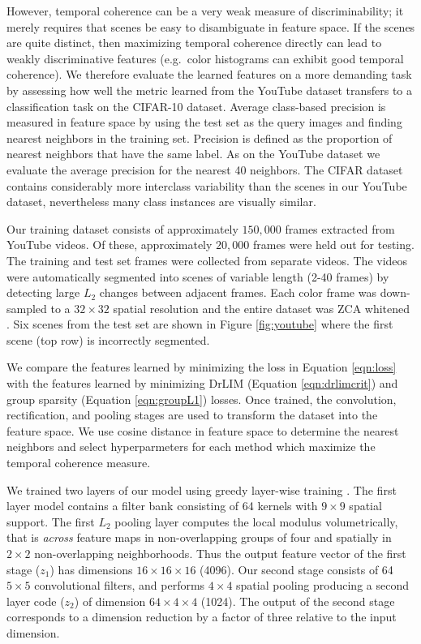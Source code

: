 \documentclass{article} %
\begin{document}
However, temporal coherence can be a very weak measure of discriminability; it merely requires that scenes be easy to disambiguate in feature space. If the scenes are quite distinct, then maximizing temporal coherence directly can lead to weakly discriminative features (e.g.~color histograms can exhibit good temporal coherence). We therefore evaluate the learned features on a more demanding task by assessing how well the metric learned from the YouTube dataset transfers to a classification task on the CIFAR-10 dataset. Average class-based precision is measured in feature space by using the test set as the query images and finding nearest neighbors in the training set. Precision is defined as the proportion of nearest neighbors that have the same label. As on the YouTube dataset we evaluate the average precision for the nearest 40 neighbors. The CIFAR dataset contains considerably more interclass variability than the scenes in our YouTube dataset, nevertheless many class instances are visually similar.  

Our training dataset consists of approximately $150,000$ frames extracted from YouTube videos. Of these, approximately $20,000$ frames were held out for testing. The training and test set frames were collected from separate videos. The videos were automatically segmented into scenes of variable length (2-40 frames) by detecting large $L_2$ changes between adjacent frames. Each color frame was down-sampled to a $32 \times 32$ spatial resolution and the entire dataset was ZCA whitened \citep{alexthesis}. Six scenes from the test set are shown in Figure \ref{fig:youtube} where the first scene (top row) is incorrectly segmented.   

We compare the features learned by minimizing the loss in Equation \ref{eqn:loss} with the features learned by minimizing DrLIM (Equation \ref{eqn:drlimcrit}) and group sparsity (Equation \ref{eqn:groupL1}) losses. Once trained, the convolution, rectification, and pooling stages are used to transform the dataset into the feature space. We use cosine distance in feature space to determine the nearest neighbors and select hyperparmeters for each method which maximize the temporal coherence measure.

We trained two layers of our model using greedy layer-wise training \cite{Bengio2012}. The first layer model contains a filter bank consisting of 64 kernels with $9 \times 9$ spatial support. The first $L_2$ pooling layer computes the local modulus volumetrically, that is \emph{across} feature maps in non-overlapping groups of four and spatially in $2 \times 2$ non-overlapping neighborhoods. Thus the output feature vector of the first stage ($z_1$) has dimensions $16 \times 16 \times 16$ (4096). Our second stage consists of 64 $5 \times 5$ convolutional filters, and performs $4 \times 4$ spatial pooling producing a second layer code ($z_2$) of dimension $64 \times 4 \times 4$ (1024). The output of the second stage corresponds to a dimension reduction by a factor of three relative to the input dimension.
\end{document}
